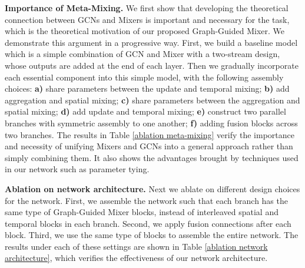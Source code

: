 \documentclass[10pt,twocolumn,letterpaper]{article}
\begin{document}
  
\noindent\textbf{Importance of Meta-Mixing.}\label{paragraph ablation setting meta-mixing}
We first show that developing the theoretical connection between GCNs and Mixers is important and necessary for the task, which is the theoretical motivation of our proposed Graph-Guided Mixer.
We demonstrate this argument in a progressive way. First, we build a baseline model which is a simple combination of GCN and Mixer with a two-stream design, whose outputs are added at the end of each layer. Then we gradually incorporate each essential component into this simple model, with the following assembly choices:
\textbf{a)} share parameters between the update and temporal mixing;
\textbf{b)} add aggregation and spatial mixing;
\textbf{c)} share parameters between the aggregation and spatial mixing;
\textbf{d)} add update and temporal mixing;
\textbf{e)} construct two parallel branches with symmetric assembly to one another;
\textbf{f)} adding fusion blocks across two branches.
The results in Table \ref{ablation meta-mixing} verify the importance and necessity of unifying Mixers and GCNs into a general approach rather than simply combining them.
It also shows the advantages brought by techniques used in our network such as parameter tying.


\noindent\textbf{Ablation on network architecture.}
Next we ablate on different design choices for the network.
First, we assemble the network such that each branch has the same type of Graph-Guided Mixer blocks, instead of interleaved spatial and temporal blocks in each branch.
Second, we apply fusion connections after each block.
Third, we use the same type of blocks to assemble the entire network.
The results under each of these settings are shown in Table \ref{ablation network architecture}, which verifies the effectiveness of our network architecture.
\end{document}
